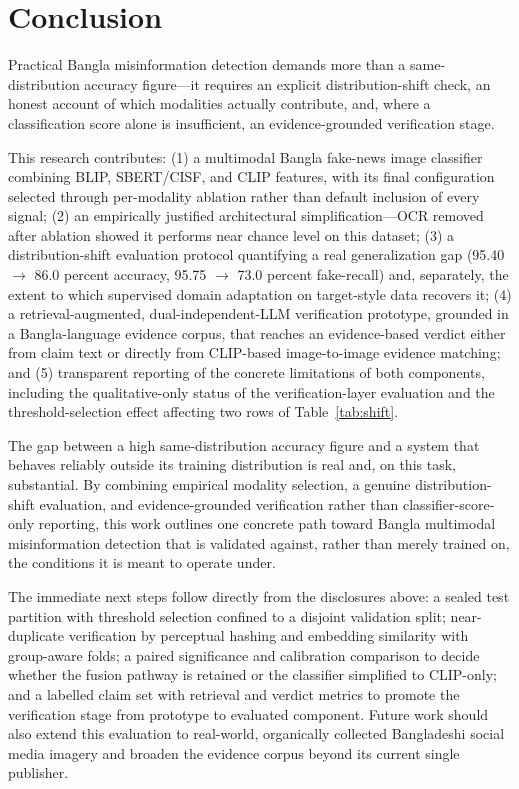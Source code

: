 \documentclass[conference,a4paper]{IEEEtran}
\begin{document}
\section{Conclusion}

Practical Bangla misinformation detection demands more than a
same-distribution accuracy figure---it requires an explicit distribution-shift
check, an honest account of which modalities actually contribute, and, where a
classification score alone is insufficient, an evidence-grounded verification
stage.

This research contributes: (1) a multimodal Bangla fake-news image classifier
combining BLIP, SBERT/CISF, and CLIP features, with its final configuration
selected through per-modality ablation rather than default inclusion of every
signal; (2) an empirically justified architectural simplification---OCR
removed after ablation showed it performs near chance level on this dataset;
(3) a distribution-shift evaluation protocol quantifying a real generalization
gap (95.40 $\rightarrow$ 86.0 percent accuracy, 95.75 $\rightarrow$
73.0 percent fake-recall) and, separately, the extent to which supervised
domain adaptation on target-style data recovers it; (4) a retrieval-augmented,
dual-independent-LLM verification prototype, grounded in a Bangla-language
evidence corpus, that reaches an evidence-based verdict either from claim text
or directly from CLIP-based image-to-image evidence matching; and
(5) transparent reporting of the concrete limitations of both components,
including the qualitative-only status of the verification-layer evaluation and
the threshold-selection effect affecting two rows of
Table~\ref{tab:shift}.

The gap between a high same-distribution accuracy figure and a system that
behaves reliably outside its training distribution is real and, on this task,
substantial. By combining empirical modality selection, a genuine
distribution-shift evaluation, and evidence-grounded verification rather than
classifier-score-only reporting, this work outlines one concrete path toward
Bangla multimodal misinformation detection that is validated against, rather
than merely trained on, the conditions it is meant to operate under.

The immediate next steps follow directly from the disclosures above: a sealed
test partition with threshold selection confined to a disjoint validation
split; near-duplicate verification by perceptual hashing and embedding
similarity with group-aware folds; a paired significance and calibration
comparison to decide whether the fusion pathway is retained or the classifier
simplified to CLIP-only; and a labelled claim set with retrieval and verdict
metrics to promote the verification stage from prototype to evaluated
component. Future work should also extend this evaluation to real-world,
organically collected Bangladeshi social media imagery and broaden the
evidence corpus beyond its current single publisher.
\end{document}
